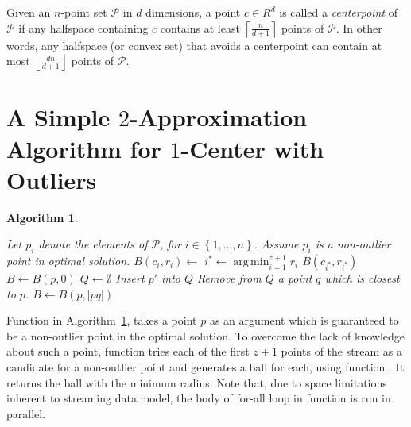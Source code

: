 \documentclass[envcountsame]{cls/cccg15}
\newtheorem{algorithm}{Algorithm}
\DeclareMathOperator*{\argmin}{arg\,min}
\newcommand{\set}[1]{\left\{ #1 \right\}}
\newcommand{\ceil}[1]{\left\lceil{#1}\right\rceil}
\newcommand{\floor}[1]{\left\lfloor{#1}\right\rfloor}
\newcommand{\card}[1]{\left|{#1}\right|}
\begin{document}

Given an $n$-point set $\mathcal{P}$ in $d$ dimensions, a point $c \in R^d$ is called a \emph{centerpoint} of $\mathcal{P}$ if any halfspace containing $c$ contains at least $\ceil{\frac{n}{d + 1}}$ points of $\mathcal{P}$. In other words, any halfspace (or convex set) that avoids a centerpoint can contain at most $\floor{\frac{dn}{d + 1}}$ points of $\mathcal{P}$.



\section{A Simple $2$-Approximation Algorithm for $1$-Center with Outliers}

\begin{algorithm}
\label{alg:1center}
\leavevmode
\begin{algorithmic}
	\State Let $p_i$ denote the elements of $\mathcal{P}$, for $i \in \set{1, \dots, n}$.
		\State Assume $p_i$ is a non-outlier point in optimal solution.
		\State $B(c_i, r_i) \gets$ 
	\EndFor
	\State $i^* \gets \argmin_{i=1}^{z+1} r_i$
	\State \Return $B(c_{i^*}, r_{i^*})$
\EndFunction
\Statex
{}
	\State $B \gets B(p, 0)$
	\State $Q \gets \emptyset$
			\State Insert $p'$ into $Q$
			\If{$\card{Q} = z + 1$}
				\State Remove from $Q$ a point $q$ which is closest to $p$.
				\State $B \gets B(p, \card{pq})$
			\EndIf
		\EndIf
	\EndFor
	\State {}
\EndFunction
\end{algorithmic}
\end{algorithm}
Function  in Algorithm~\ref{alg:1center}, takes a point $p$ as an argument which is guaranteed to be a non-outlier point in the optimal solution. To overcome the lack of knowledge about such a point, function  tries each of the first $z+1$ points of the stream as a candidate for a non-outlier point and generates a ball for each, using function . It returns the ball with the minimum radius. Note that, due to space limitations inherent to streaming data model, the body of for-all loop in function  is run in parallel.
\end{document}
